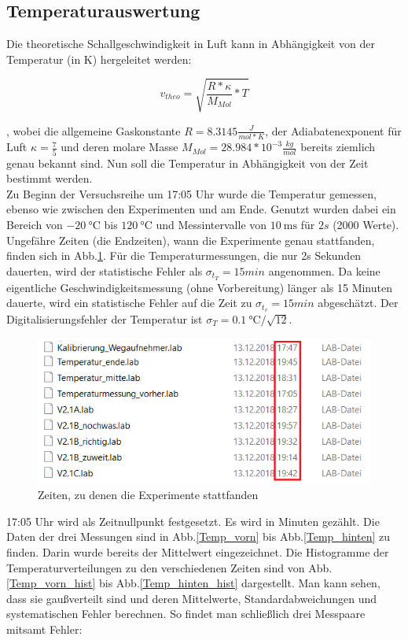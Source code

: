 \documentclass[]{article}
\begin{document}
	\subsection{Temperaturauswertung}
	Die theoretische Schallgeschwindigkeit in Luft kann in Abhängigkeit von der Temperatur (in K) hergeleitet werden:
	
	\begin{equation}
	v_{theo}=\sqrt{\frac{R*\kappa}{M_{Mol}}*T}
	\label{v(T)}
	\end{equation}
	
	, wobei die allgemeine Gaskonstante $R=8.3145 \frac{J}{mol*K}$, der Adiabatenexponent für Luft $\kappa=\frac{7}{5}$ und deren molare Masse $M_{Mol}=28.984*10^{-3} \frac{kg}{mol}$ bereits ziemlich genau bekannt sind.
	Nun soll die Temperatur in Abhängigkeit von der Zeit bestimmt werden.\\
	Zu Beginn der Versuchsreihe um 17:05 Uhr wurde die Temperatur gemessen, ebenso wie zwischen den Experimenten und am Ende. Genutzt wurden dabei ein Bereich von $\SI{-20}{\celsius}$ bis $\SI{120}{\celsius}$ und Messintervalle von $\SI{10}{\milli\second}$ für $2s$ (2000 Werte).
	Ungefähre Zeiten (die Endzeiten), wann die Experimente genau stattfanden, finden sich in Abb.\ref{Temp_Zeiten}. Für die Temperaturmessungen, die nur 2s Sekunden dauerten, wird der statistische Fehler als $\sigma_{t_T}=15min$ angenommen. Da keine eigentliche Geschwindigkeitsmessung (ohne Vorbereitung) länger als 15 Minuten dauerte, wird ein statistische Fehler auf die Zeit zu $\sigma_{t_v}=15min$ abgeschätzt. Der Digitalisierungsfehler der Temperatur ist $\sigma_T=\SI{0.1}{\celsius}/\sqrt{12}$.\\
	
	\begin{figure}
		\begin{center}
			\includegraphics[scale=0.9]{Images/Messreihenendzeiten.png}
			\caption{Zeiten, zu denen die Experimente stattfanden}
			\label{Temp_Zeiten}
		\end{center}
	\end{figure}
	17:05 Uhr wird als Zeitnullpunkt festgesetzt. Es wird in Minuten gezählt. Die Daten der drei Messungen sind in Abb.\ref{Temp_vorn} bis Abb.\ref{Temp_hinten} zu finden. Darin wurde bereits der Mittelwert eingezeichnet. Die Histogramme der Temperaturverteilungen zu den verschiedenen Zeiten sind von Abb.\ref{Temp_vorn_hist}
 	bis Abb.\ref{Temp_hinten_hist} dargestellt. Man kann sehen, dass sie gaußverteilt sind und deren Mittelwerte, Standardabweichungen und systematischen Fehler berechnen. So findet man schließlich drei Messpaare mitsamt Fehler:
 	
\end{document}
